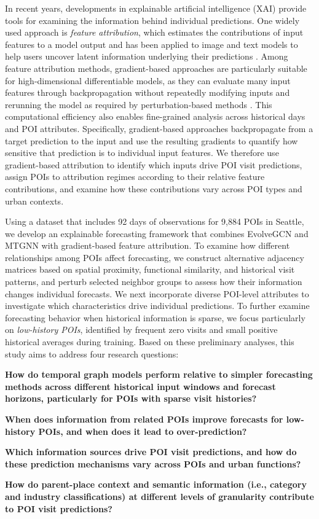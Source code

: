 \documentclass[preprint,authoryear,11pt]{elsarticle}
\def\citep#1{}%
\theoremstyle{definition}
\begin{document}
In recent years, developments in explainable artificial intelligence (XAI) provide tools for examining the information behind individual predictions. One widely used approach is \textit{feature attribution}, which estimates the contributions of input features to a model output and has been applied to image and text models to help users uncover latent information underlying their predictions \citep{ribeiro2016should,pmlr-v70-sundararajan17a}. 
Among feature attribution methods, gradient-based approaches are particularly suitable for high-dimensional differentiable models, as they can evaluate many input features through backpropagation without repeatedly modifying inputs and rerunning the model as required by perturbation-based methods \citep{pmlr-v70-sundararajan17a,ivanovs2021perturbation}.  
This computational efficiency also enables fine-grained analysis across historical days and POI attributes. Specifically, gradient-based approaches backpropagate from a target prediction to the input and use the resulting gradients to quantify how sensitive that prediction is to individual input features. 
We therefore use gradient-based attribution to identify which inputs drive POI visit predictions, assign POIs to attribution regimes according to their relative feature contributions, and examine how these contributions vary across POI types and urban contexts.

Using a dataset that includes 92 days of observations for 9,884 POIs in Seattle, we develop an explainable forecasting framework that combines EvolveGCN and MTGNN with gradient-based feature attribution. 
To examine how different relationships among POIs affect forecasting, we construct alternative adjacency matrices based on spatial proximity, functional similarity, and historical visit patterns, and perturb selected neighbor groups to assess how their information changes individual forecasts. 
We next incorporate diverse POI-level attributes to investigate which characteristics drive individual predictions.
To further examine forecasting behavior when historical information is sparse, we focus particularly on \textit{low-history POIs}, identified by frequent zero visits and small positive historical averages during training. 
Based on these preliminary analyses, this study aims to address four research questions:
\begin{compactenum}
    \item \textbf{How do temporal graph models perform relative to simpler forecasting methods across different historical input windows and forecast horizons, particularly for POIs with sparse visit histories?}
    \item \textbf{When does information from related POIs improve forecasts for low-history POIs, and when does it lead to over-prediction?}
    \item \textbf{Which information sources drive POI visit predictions, and how do these prediction mechanisms vary across POIs and urban functions?}
    \item \textbf{How do parent-place context and semantic information (i.e., category and industry classifications) at different levels of granularity contribute to POI visit predictions?}
\end{compactenum}
\end{document}
